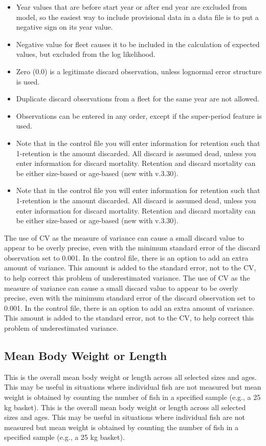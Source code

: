 \begin{itemize}
	\item Year values that are before start year or after end year are excluded from model, so the easiest way to include provisional data in a data file is to put a negative sign on its year value.
	\item Negative value for fleet causes it to be included in the calculation of expected values, but excluded from the log likelihood.
	\item Zero (0.0) is a legitimate discard observation, unless lognormal error structure is used.
	\item Duplicate discard observations from a fleet for the same year are not allowed.
	\item Observations can be entered in any order, except if the super-period feature is used. 
	\item Note that in the control file you will enter information for retention such that 1-retention is the amount discarded. All discard is assumed dead, unless you enter information for discard mortality. Retention and discard mortality can be either size-based or age-based (new with v.3.30).
	\item Note that in the control file you will enter information for retention such that 1-retention is the amount discarded. All discard is assumed dead, unless you enter information for discard mortality. Retention and discard mortality can be either size-based or age-based (new with v.3.30).
\end{itemize}
	
The use of CV as the measure of variance can cause a small discard value to appear to be overly precise, even with the minimum standard error of the discard observation set to 0.001. In the control file, there is an option to add an extra amount of variance. This amount is added to the standard error, not to the CV, to help correct this problem of underestimated variance.
The use of CV as the measure of variance can cause a small discard value to appear to be overly precise, even with the minimum standard error of the discard observation set to 0.001. In the control file, there is an option to add an extra amount of variance. This amount is added to the standard error, not to the CV, to help correct this problem of underestimated variance.


\subsection{Mean Body Weight or Length}
This is the overall mean body weight or length across all selected sizes and ages. This may be useful in situations where individual fish are not measured but mean weight is obtained by counting the number of fish in a specified sample (e.g., a 25 kg basket).  
This is the overall mean body weight or length across all selected sizes and ages. This may be useful in situations where individual fish are not measured but mean weight is obtained by counting the number of fish in a specified sample (e.g., a 25 kg basket).  

